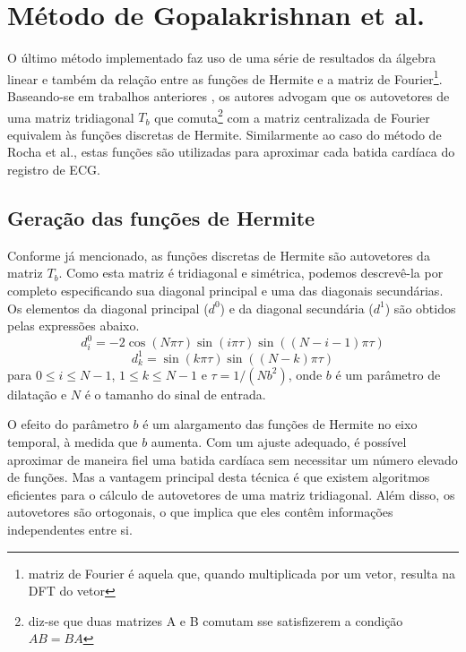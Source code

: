 
\section{Método de Gopalakrishnan et al.}
\label{sec:section4}
O último método implementado faz uso de uma série de resultados da álgebra linear e também da relação entre as funções de Hermite e a matriz de Fourier\footnote{matriz de Fourier é aquela que, quando multiplicada por um vetor, resulta na DFT do vetor}. Baseando-se em trabalhos anteriores \cite{Mugler02}, os autores advogam que os autovetores de uma matriz tridiagonal $T_b$ que comuta\footnote{diz-se que duas matrizes A e B comutam sse satisfizerem a condição $AB = BA$} com a matriz centralizada de Fourier equivalem às funções discretas de Hermite. Similarmente ao caso do método de Rocha et al., estas funções são utilizadas para aproximar cada batida cardíaca do registro de ECG.

\subsection{Geração das funções de Hermite}
Conforme já mencionado, as funções discretas de Hermite são autovetores da matriz $T_b$. Como esta matriz é tridiagonal e simétrica, podemos descrevê-la por completo especificando sua diagonal principal e uma das diagonais secundárias. Os elementos da diagonal principal ($d^0$) e da diagonal secundária ($d^1$) são obtidos pelas expressões abaixo.
\begin{equation} \label{equ:main_diagonal}
    d^0_{i} = -2\cos(N\pi\tau)\sin(i\pi\tau)\sin((N-i-1)\pi\tau)
\end{equation}
\begin{equation} \label{equ:off_diagonal}
    d^1_{k} = \sin(k\pi\tau)\sin((N-k)\pi\tau)
\end{equation}
para $0\leq i\leq N-1$, $1\leq k\leq N-1$ e $\tau = 1/(Nb^2)$, onde $b$ é um parâmetro de dilatação e $N$ é o tamanho do sinal de entrada.

O efeito do parâmetro $b$ é um alargamento das funções de Hermite no eixo temporal, à medida que $b$ aumenta. Com um ajuste adequado, é possível aproximar de maneira fiel uma batida cardíaca sem necessitar um número elevado de funções. Mas a vantagem principal desta técnica é que existem algoritmos eficientes para o cálculo de autovetores de uma matriz tridiagonal. Além disso, os autovetores são ortogonais, o que implica que eles contêm informações independentes entre si.

